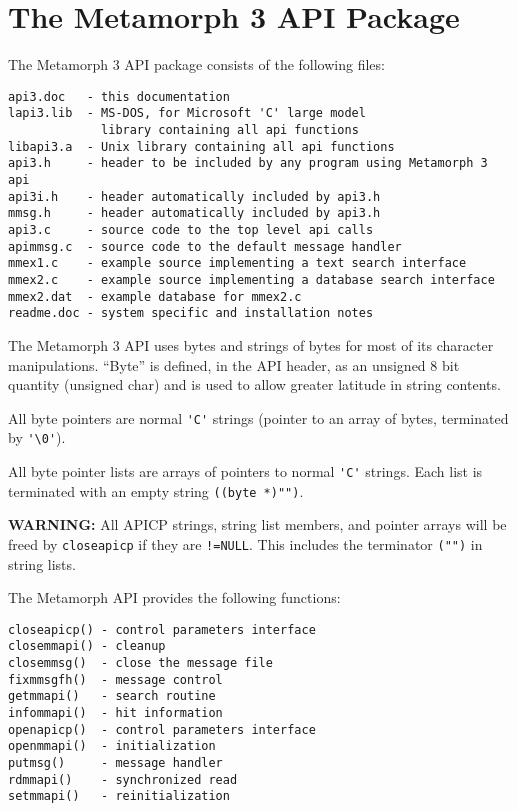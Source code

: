 \section{The Metamorph 3 API Package}

The Metamorph 3 API package consists of the following files:

\begin{verbatim}
api3.doc   - this documentation
lapi3.lib  - MS-DOS, for Microsoft 'C' large model
             library containing all api functions
libapi3.a  - Unix library containing all api functions
api3.h     - header to be included by any program using Metamorph 3 api
api3i.h    - header automatically included by api3.h
mmsg.h     - header automatically included by api3.h
api3.c     - source code to the top level api calls
apimmsg.c  - source code to the default message handler
mmex1.c    - example source implementing a text search interface
mmex2.c    - example source implementing a database search interface
mmex2.dat  - example database for mmex2.c
readme.doc - system specific and installation notes
\end{verbatim}

The Metamorph 3 API uses bytes and strings of bytes for most of
its character manipulations.  ``Byte'' is defined, in the API
header, as an unsigned 8 bit quantity (unsigned char) and is used
to allow greater latitude in string contents.

All byte pointers are normal \verb`'C'` strings (pointer to an array of
bytes, terminated by \verb`'\0'`).

All byte pointer lists are arrays of pointers to normal \verb`'C'`
strings.  Each list is terminated with an empty string
\verb`((byte *)"")`.

{\bf WARNING: }  All APICP strings, string list members, and pointer arrays
will be freed by \verb`closeapicp` if they are \verb`!=NULL`.  This
includes the terminator \verb`("")` in string lists.

The Metamorph API provides the following functions:

\begin{verbatim}
closeapicp() - control parameters interface
closemmapi() - cleanup
closemmsg()  - close the message file
fixmmsgfh()  - message control
getmmapi()   - search routine
infommapi()  - hit information
openapicp()  - control parameters interface
openmmapi()  - initialization
putmsg()     - message handler
rdmmapi()    - synchronized read
setmmapi()   - reinitialization
\end{verbatim}

